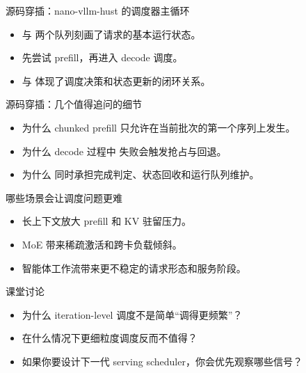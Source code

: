 \begin{frame}{源码穿插：nano-vllm-hust 的调度器主循环}
  \begin{itemize}
    \item \texttt{} 与 \texttt{} 两个队列刻画了请求的基本运行状态。
    \item \texttt{} 先尝试 prefill，再进入 decode 调度。
    \item \texttt{} 与 \texttt{} 体现了调度决策和状态更新的闭环关系。
  \end{itemize}
\end{frame}

\begin{frame}{源码穿插：几个值得追问的细节}
  \begin{itemize}
    \item 为什么 chunked prefill 只允许在当前批次的第一个序列上发生。
    \item 为什么 decode 过程中 \texttt{} 失败会触发抢占与回退。
    \item 为什么 \texttt{} 同时承担完成判定、状态回收和运行队列维护。
  \end{itemize}
\end{frame}

\begin{frame}{哪些场景会让调度问题更难}
  \begin{itemize}
    \item 长上下文放大 prefill 和 KV 驻留压力。
    \item MoE 带来稀疏激活和跨卡负载倾斜。
    \item 智能体工作流带来更不稳定的请求形态和服务阶段。
  \end{itemize}
\end{frame}



\begin{frame}{课堂讨论}
  \begin{itemize}
    \item 为什么 iteration-level 调度不是简单“调得更频繁”？
    \item 在什么情况下更细粒度调度反而不值得？
    \item 如果你要设计下一代 serving scheduler，你会优先观察哪些信号？
  \end{itemize}
\end{frame}

